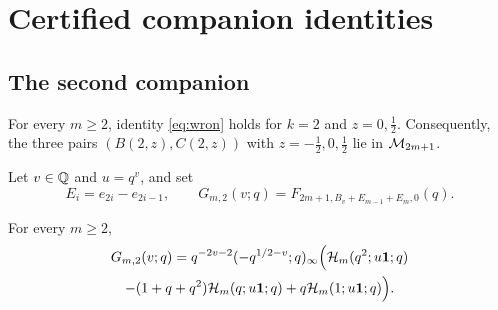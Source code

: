 \section{Certified companion identities}\label{sec:cert}

\subsection{The second companion}

\begin{theorem}\label{thm:k2}
For every $m\ge2$, identity \eqref{eq:wron} holds for $k=2$ and $z=0,\frac12$. Consequently, the three pairs $(B(2,z),C(2,z))$ with $z=-\frac12,0,\frac12$ lie in $\mathcal{M}_{2m+1}$.
\end{theorem}

Let $v\in\mathbb{Q}$ and $u=q^v$, and set
\[
E_i=e_{2i}-e_{2i-1},\qquad G_{m,2}(v;q)=F_{2m+1,B_v+E_{m-1}+E_m,0}(q).
\]

\begin{lemma}\label{lem:k2red}
For every $m\ge2$,
\begin{multline}\label{eq:k2red}
G_{m,2}(v;q)=q^{-2v-2}(-q^{1/2-v};q)_\infty\Bigl(\mathcal{H}_m(q^2;u\mathbf{1};q)\\
-(1+q+q^2)\mathcal{H}_m(q;u\mathbf{1};q)+q\mathcal{H}_m(1;u\mathbf{1};q)\Bigr).
\end{multline}
\end{lemma}

